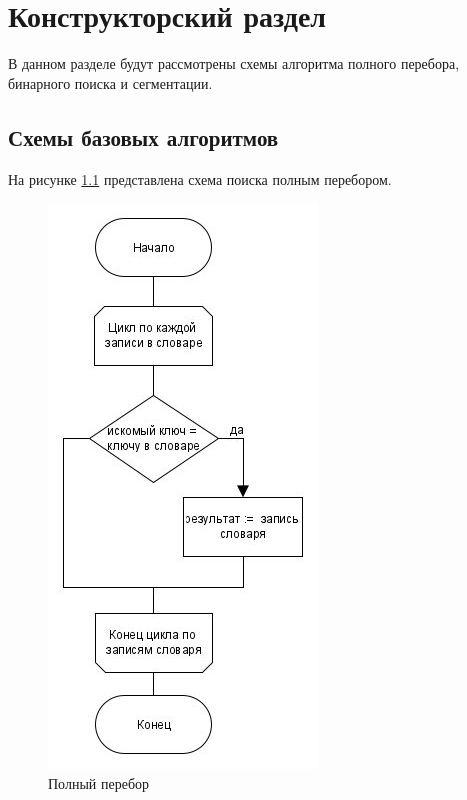 \chapter{Конструкторский раздел}
\label{cha:design}
В данном разделе будут рассмотрены схемы алгоритма полного перебора, бинарного поиска и сегментации.

\section{Схемы базовых алгоритмов}
\label{sec:schemes}
На рисунке \ref{fig:fullsearch} представлена схема поиска полным перебором.
\begin{figure}[H]
	\centering
	\includegraphics[width=0.5\linewidth]{src/fullsearch}
	\caption{Полный перебор}
	\label{fig:fullsearch}
\end{figure}

